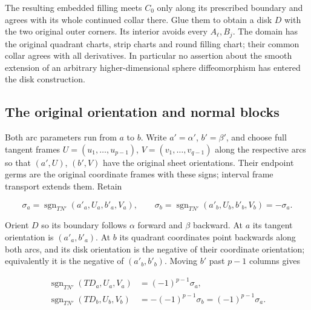The resulting embedded filling meets \(C_0\) only along its prescribed boundary and agrees with its whole continued collar there. Glue them to obtain a disk \(D\) with the two original outer corners. Its interior avoids every \(A_\ell,B_j\). The domain has the original quadrant charts, strip charts and round filling chart; their common collar agrees with all derivatives. In particular no assertion about the smooth extension of an arbitrary higher-dimensional sphere diffeomorphism has entered the disk construction.

\subsection{The original orientation and normal blocks}
\label{courseIII:whitney-moves-in-the-receiving-dimensions:receiving-whitney-normal-blocks}

\label{courseIII:whitney-moves-in-the-receiving-dimensions:section-2}\label{courseIII:whitney-receiving:2}

Both arc parameters run from \(a\) to \(b\). Write \(a'=\alpha'\), \(b'=\beta'\), and choose full tangent frames \(U=(u_1,\ldots,u_{p-1})\), \(V=(v_1,\ldots,v_{q-1})\) along the respective arcs so that \((a',U)\), \((b',V)\) have the original sheet orientations. Their endpoint germs are the original coordinate frames with these signs; interval frame transport extends them. Retain

\begin{equation}
\sigma_a=\operatorname{sgn}_{TN'}(a'_a,U_a,b'_a,V_a),\qquad
 \sigma_b=\operatorname{sgn}_{TN'}(a'_b,U_b,b'_b,V_b)
          =-\sigma_a.
 \label{courseIII:whitney-moves-in-the-receiving-dimensions:eq:2.1}
\end{equation}

Orient \(D\) so its boundary follows \(\alpha\) forward and \(\beta\) backward. At \(a\) its tangent orientation is \((a'_a,b'_a)\). At \(b\) its quadrant coordinates point backwards along both arcs, and its disk orientation is the negative of their coordinate orientation; equivalently it is the negative of \((a'_b,b'_b)\). Moving \(b'\) past \(p-1\) columns gives

\begin{equation}
\begin{aligned}
 \operatorname{sgn}_{TN'}(TD_a,U_a,V_a)
       &=(-1)^{p-1}\sigma_a,\\
 \operatorname{sgn}_{TN'}(TD_b,U_b,V_b)
       &=-(-1)^{p-1}\sigma_b
        =(-1)^{p-1}\sigma_a .
 \end{aligned}
 \label{courseIII:whitney-moves-in-the-receiving-dimensions:eq:2.2}
\end{equation}

